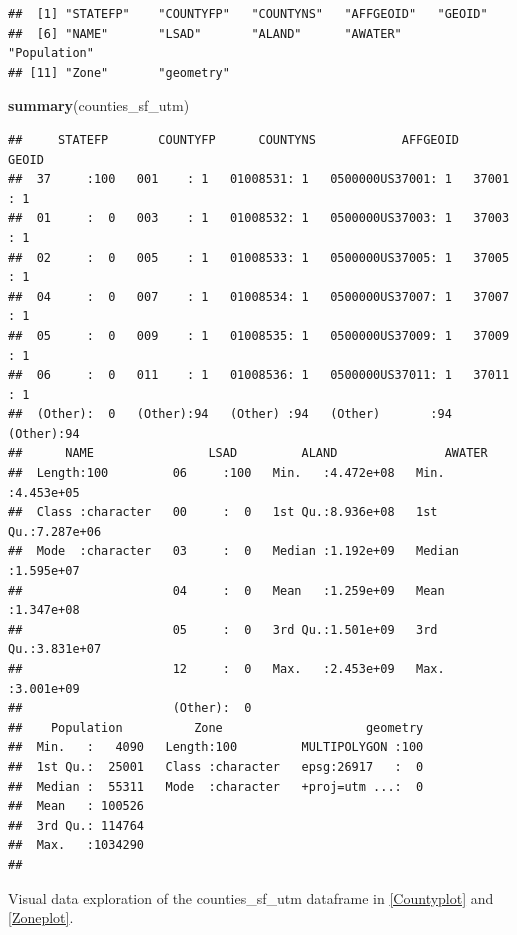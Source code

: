 \documentclass[12pt,]{article}
\newenvironment{Shaded}{\begin{snugshade}}{\end{snugshade}}
\newcommand{\KeywordTok}[1]{\textcolor[rgb]{0.13,0.29,0.53}{\textbf{#1}}}
\newcommand{\NormalTok}[1]{#1}
\begin{document}
\begin{verbatim}
##  [1] "STATEFP"    "COUNTYFP"   "COUNTYNS"   "AFFGEOID"   "GEOID"     
##  [6] "NAME"       "LSAD"       "ALAND"      "AWATER"     "Population"
## [11] "Zone"       "geometry"
\end{verbatim}

\begin{Shaded}
\begin{Highlighting}[]
\KeywordTok{summary}\NormalTok{(counties_sf_utm)}
\end{Highlighting}
\end{Shaded}

\begin{verbatim}
##     STATEFP       COUNTYFP      COUNTYNS            AFFGEOID      GEOID   
##  37     :100   001    : 1   01008531: 1   0500000US37001: 1   37001  : 1  
##  01     :  0   003    : 1   01008532: 1   0500000US37003: 1   37003  : 1  
##  02     :  0   005    : 1   01008533: 1   0500000US37005: 1   37005  : 1  
##  04     :  0   007    : 1   01008534: 1   0500000US37007: 1   37007  : 1  
##  05     :  0   009    : 1   01008535: 1   0500000US37009: 1   37009  : 1  
##  06     :  0   011    : 1   01008536: 1   0500000US37011: 1   37011  : 1  
##  (Other):  0   (Other):94   (Other) :94   (Other)       :94   (Other):94  
##      NAME                LSAD         ALAND               AWATER         
##  Length:100         06     :100   Min.   :4.472e+08   Min.   :4.453e+05  
##  Class :character   00     :  0   1st Qu.:8.936e+08   1st Qu.:7.287e+06  
##  Mode  :character   03     :  0   Median :1.192e+09   Median :1.595e+07  
##                     04     :  0   Mean   :1.259e+09   Mean   :1.347e+08  
##                     05     :  0   3rd Qu.:1.501e+09   3rd Qu.:3.831e+07  
##                     12     :  0   Max.   :2.453e+09   Max.   :3.001e+09  
##                     (Other):  0                                          
##    Population          Zone                    geometry  
##  Min.   :   4090   Length:100         MULTIPOLYGON :100  
##  1st Qu.:  25001   Class :character   epsg:26917   :  0  
##  Median :  55311   Mode  :character   +proj=utm ...:  0  
##  Mean   : 100526                                         
##  3rd Qu.: 114764                                         
##  Max.   :1034290                                         
## 
\end{verbatim}

Visual data exploration of the counties\_sf\_utm dataframe in
\autoref{Countyplot} and \autoref{Zoneplot}.
\end{document}
